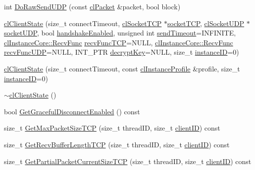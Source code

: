 \begin{DoxyCompactItemize}
\item 
int \hyperlink{classcl_client_state_abfab264fa6f8a55abf4b4c5d645deba2}{DoRawSendUDP} (const \hyperlink{classcl_packet}{clPacket} \&packet, bool block)
\item 
\hyperlink{classcl_client_state_a063ef9858fccf0f90d50a387e91c3bec}{clClientState} (size\_\-t connectTimeout, \hyperlink{classcl_socket_t_c_p}{clSocketTCP} $\ast$\hyperlink{classcl_client_state_ac58716d4f5c67f88577540d0272f0804}{socketTCP}, \hyperlink{classcl_socket_u_d_p}{clSocketUDP} $\ast$\hyperlink{classcl_instance_u_d_p_adabf31cb357eb5dada6ad5c8e57c611e}{socketUDP}, bool \hyperlink{classcl_instance_t_c_p_a4a35647e926d2c2c5abec877242f69fa}{handshakeEnabled}, unsigned int \hyperlink{classcl_instance_core_a05be31d3ac12930f23fb1a06c25b225c}{sendTimeout}=INFINITE, \hyperlink{classcl_instance_core_afa96c2a2c0b26b6a9256b87798bf9587}{clInstanceCore::RecvFunc} \hyperlink{classcl_instance_t_c_p_aae4ec2a4dd6ac904c67e53c0620e2843}{recvFuncTCP}=NULL, \hyperlink{classcl_instance_core_afa96c2a2c0b26b6a9256b87798bf9587}{clInstanceCore::RecvFunc} \hyperlink{classcl_instance_u_d_p_a71fd288aaec92fa83f45060bc15d1f1e}{recvFuncUDP}=NULL, INT\_\-PTR \hyperlink{classcl_client_state_ab8feb66a89295b2ee744245aad8e86ba}{decryptKey}=NULL, size\_\-t \hyperlink{classcl_instance_core_ad3de74dbad74098dc2f010806186bf7f}{instanceID}=0)
\item 
\hyperlink{classcl_client_state_a008f55bf780aca9e02eecea61b83c19c}{clClientState} (size\_\-t connectTimeout, const \hyperlink{classcl_instance_profile}{clInstanceProfile} \&profile, size\_\-t \hyperlink{classcl_instance_core_ad3de74dbad74098dc2f010806186bf7f}{instanceID}=0)
\item 
\hyperlink{classcl_client_state_add703eb88e78da6ed99323dc9607aa8c}{$\sim$clClientState} ()
\item 
bool \hyperlink{classcl_client_state_a7f4bf7e8f386b15f7665929212f56a4b}{GetGracefulDisconnectEnabled} () const 
\item 
size\_\-t \hyperlink{classcl_client_state_acbd393fc852bbdcde7dc119342ce3edc}{GetMaxPacketSizeTCP} (size\_\-t threadID, size\_\-t \hyperlink{classcl_client_state_a4153db8a239f862cbd61bf8e75e25794}{clientID}) const 
\item 
size\_\-t \hyperlink{classcl_client_state_a71c061f87888b1c8f45e1edec5564f4f}{GetRecvBufferLengthTCP} (size\_\-t threadID, size\_\-t \hyperlink{classcl_client_state_a4153db8a239f862cbd61bf8e75e25794}{clientID}) const 
\item 
size\_\-t \hyperlink{classcl_client_state_a25553b01d03b04f99f08edcddb5fe767}{GetPartialPacketCurrentSizeTCP} (size\_\-t threadID, size\_\-t \hyperlink{classcl_client_state_a4153db8a239f862cbd61bf8e75e25794}{clientID}) const 

\end{DoxyCompactItemize}
